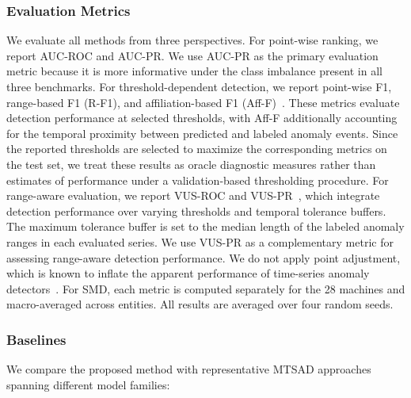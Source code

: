 \subsubsection{Evaluation Metrics}
\label{sec:evaluation_metrics}

We evaluate all methods from three perspectives. For point-wise ranking, we report AUC-ROC and AUC-PR. We use AUC-PR as the primary evaluation metric because it is more informative under the class imbalance present in all three benchmarks. For threshold-dependent detection, we report point-wise F1, range-based F1 (R-F1), and affiliation-based F1 (Aff-F)~\cite{huet2022affiliation}. These metrics evaluate detection performance at selected thresholds, with Aff-F additionally accounting for the temporal proximity between predicted and labeled anomaly events. Since the reported thresholds are selected to maximize the corresponding metrics on the test set, we treat these results as oracle diagnostic measures rather than estimates of performance under a validation-based thresholding procedure. For range-aware evaluation, we report VUS-ROC and VUS-PR~\cite{paparrizos2022vus}, which integrate detection performance over varying thresholds and temporal tolerance buffers. The maximum tolerance buffer is set to the median length of the labeled anomaly ranges in each evaluated series. We use VUS-PR as a complementary metric for assessing range-aware detection performance. We do not apply point adjustment, which is known to inflate the apparent performance of time-series anomaly detectors~\cite{kim2022towards}. For SMD, each metric is computed separately for the 28 machines and macro-averaged across entities. All results are averaged over four random seeds.

\subsubsection{Baselines}
\label{sec:baselines}

We compare the proposed method with representative MTSAD approaches spanning
different model families:

